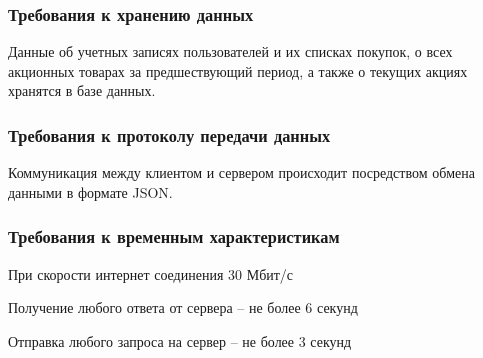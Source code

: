 \subsubsection{Требования к хранению данных}
Данные об учетных записях пользователей и их списках покупок,
о всех акционных товарах за предшествующий период,
а также о текущих акциях
хранятся в базе данных.

\subsubsection{Требования к протоколу передачи данных}
Коммуникация между клиентом и сервером происходит посредством обмена данными в формате JSON.

\subsubsection{Требования к временным характеристикам}
При скорости интернет соединения 30 Мбит/с
\begin{my_enumerate}
\item Получение любого ответа от сервера -- не более 6 секунд
\item Отправка любого запроса на сервер -- не более 3 секунд
\end{my_enumerate}

